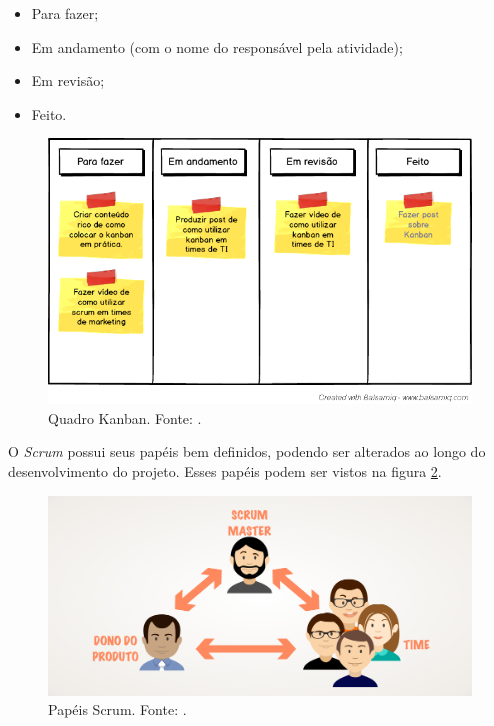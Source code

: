 \begin{itemize}
	\item Para fazer;
	\item Em andamento (com o nome do responsável pela atividade);
	\item Em revisão;
	\item Feito.
\end{itemize}

\begin{figure}[H]
	\centering
	\includegraphics[width=1.0\textwidth]{figuras/kanban.png}
	\caption{Quadro Kanban. Fonte: .}
	\label{img:kanban}
\end{figure}

O \textit{Scrum} possui seus papéis bem definidos, podendo ser alterados ao longo do desenvolvimento do projeto. Esses papéis podem ser vistos na figura \ref{img:papeis_scrum}.

\begin{figure}[H]
	\centering
	\includegraphics[width=1.0\textwidth]{figuras/papeis_scrum.png}
	\caption{Papéis Scrum. Fonte: .}
	\label{img:papeis_scrum}
\end{figure}

